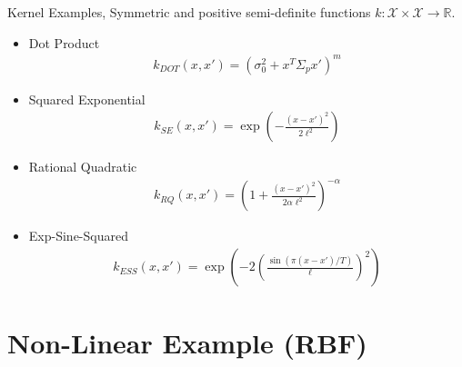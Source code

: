 \documentclass[10pt]{beamer}
\begin{document}
\begin{frame}{Kernel Examples}{\cite{ROERGA}, \cite[Chapter 4.2]{RW05}}
Symmetric and positive semi-definite functions $k:\mathcal{X}\times\mathcal{X}\longrightarrow \mathbb{R}$. 
\begin{itemize}
\item Dot Product 
\begin{align*}
k_{DOT}(x, x') = (\sigma_0^2 + x^T\Sigma_p x')^m
\end{align*}
\item Squared Exponential 
\begin{align*}
k_{SE}(x, x') = \exp\left(- \frac{(x - x')^2}{2\ell ^2}\right)
\end{align*}
\item Rational Quadratic 
\begin{align*}
k_{RQ}(x, x') = \left(1 + \frac{(x - x')^2}{2\alpha\ell^2}\right)^{-\alpha}
\end{align*}
\item Exp-Sine-Squared 
\begin{align*}
k_{ESS} (x, x')= \exp\left(-2 \left(\frac{\sin(\pi (x - x')/T )}{\ell}\right)^2\right)
\end{align*}
\end{itemize}
\end{frame}

\section{Non-Linear Example (RBF)}
\end{document}
